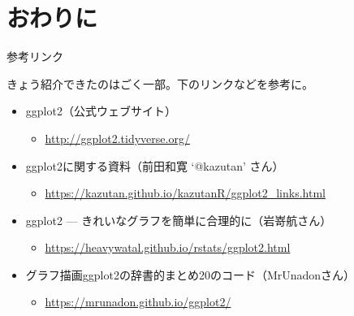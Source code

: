 \documentclass[ignorenonframetext,]{beamer}
\providecommand{\tightlist}{%
  \setlength{\itemsep}{0pt}\setlength{\parskip}{0pt}}
\begin{document}
\section{おわりに}

\begin{frame}{参考リンク}

きょう紹介できたのはごく一部。下のリンクなどを参考に。

\begin{itemize}
\tightlist
\item
  ggplot2（公式ウェブサイト）

  \begin{itemize}
  \tightlist
  \item
    \url{http://ggplot2.tidyverse.org/}
  \end{itemize}
\item
  ggplot2に関する資料（前田和寛 `@kazutan' さん）

  \begin{itemize}
  \tightlist
  \item
    \url{https://kazutan.github.io/kazutanR/ggplot2_links.html}
  \end{itemize}
\item
  ggplot2 --- きれいなグラフを簡単に合理的に（岩嵜航さん）

  \begin{itemize}
  \tightlist
  \item
    \url{https://heavywatal.github.io/rstats/ggplot2.html}
  \end{itemize}
\item
  グラフ描画ggplot2の辞書的まとめ20のコード（MrUnadonさん）

  \begin{itemize}
  \tightlist
  \item
    \url{https://mrunadon.github.io/ggplot2/}
  \end{itemize}
\end{itemize}

\end{frame}
\end{document}
